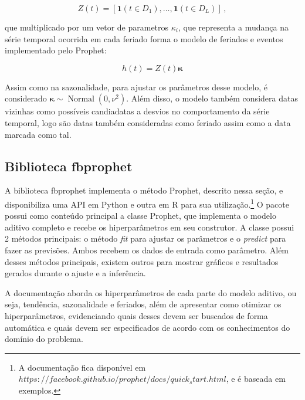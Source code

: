 \begin{equation}
    Z(t)=\left[\mathbf{1}\left(t \in D_{1}\right), \ldots, \mathbf{1}\left(t \in D_{L}\right)\right] \, ,
\end{equation}

que multiplicado por um vetor de parametros $\kappa_{i}$, que representa a mudança na série temporal ocorrida em cada feriado forma o modelo de feriados e eventos implementado pelo Prophet:

\begin{equation}
    h(t)=Z(t) \boldsymbol{\kappa}
\end{equation}

Assim como na sazonalidade, para ajustar os parâmetros desse modelo, é considerado $\boldsymbol{\kappa} \sim \operatorname{Normal}\left(0, \nu^{2}\right) .$ Além disso, o modelo também considera datas vizinhas como possíveis candiadatas a desvios no comportamento da série temporal, logo são datas também consideradas como feriado assim como a data marcada como tal.

\subsection{Biblioteca fbprophet}
A biblioteca fbprophet implementa o método Prophet, descrito nessa seção, e disponibiliza uma API em Python e outra em R para sua utilização.\footnote{A documentação fica disponível em $https://facebook.github.io/prophet/docs/quick_start.html$, e é baseada em exemplos.} O pacote possui como conteúdo principal a classe Prophet, que implementa o modelo aditivo completo e recebe os hiperparâmetros em seu construtor. A classe possui 2 métodos principais: o método \textit{fit} para ajustar os parâmetros e o \textit{predict} para fazer as previsões. Ambos recebem os dados de entrada como parâmetro. Além desses métodos principais, existem outros para mostrar gráficos e resultados gerados durante o ajuste e a inferência.

A documentação aborda os hiperparâmetros de cada parte do modelo aditivo, ou seja, tendência, sazonalidade e feriados, além de apresentar como otimizar os hiperparâmetros, evidenciando quais desses devem ser buscados de forma automática e quais devem ser especificados de acordo com os conhecimentos do domínio do problema.

